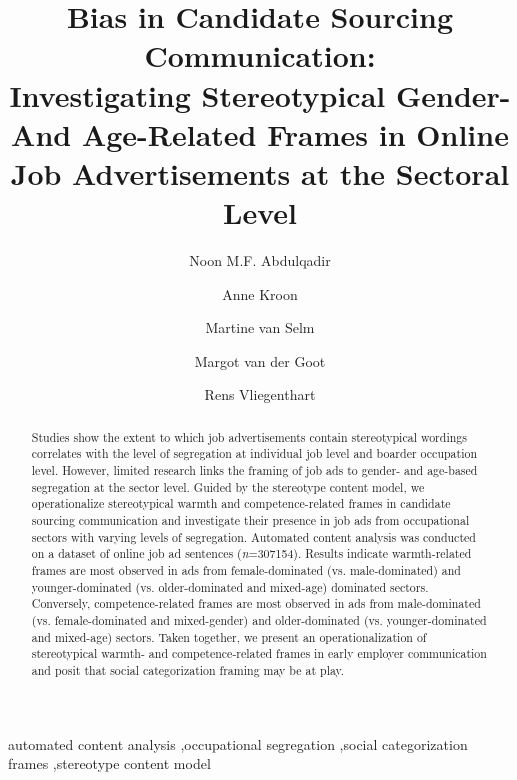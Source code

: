\documentclass[preprint, review, 12pt]{elsarticle}
\begin{document}
\begin{frontmatter}
\title{Bias in Candidate Sourcing Communication:\\Investigating Stereotypical Gender- And Age-Related Frames in Online Job Advertisements at the Sectoral Level}

\author[uva]{Noon M.F. Abdulqadir  }

\author[uva]{Anne Kroon }
\author[erasmus]{Martine van Selm }
\author[uva]{Margot van der Goot }
\author[wur]{Rens Vliegenthart }

\address[uva]{Amsterdam School of Communication Research (ASCoR)}
\address[erasmus]{Erasmus School of History, Culture and Communication (ESHCC)}
\address[wur]{Wageningen University and Research (WUR)}

\begin{abstract}
    Studies show the extent to which job advertisements contain stereotypical wordings correlates with the level of segregation at individual job level and boarder occupation level. However, limited research links the framing of job ads to gender- and age-based segregation at the sector level. Guided by the stereotype content model, we operationalize stereotypical warmth and competence-related frames in candidate sourcing communication and investigate their presence in job ads from occupational sectors with varying levels of segregation. Automated content analysis was conducted on a dataset of online job ad sentences (\textit{n}=307154). Results indicate warmth-related frames are most observed in ads from female-dominated (vs. male-dominated) and younger-dominated (vs. older-dominated and mixed-age) dominated sectors. Conversely, competence-related frames are most observed in ads from male-dominated (vs. female-dominated and mixed-gender) and older-dominated (vs. younger-dominated and mixed-age) sectors. Taken together, we present an operationalization of stereotypical warmth- and competence-related frames in early employer communication and posit that social categorization framing may be at play.
    \end{abstract}

\begin{keyword}
    automated content analysis \sep occupational segregation \sep social categorization frames \sep stereotype content model
    \end{keyword}

\end{frontmatter}
\end{document}
